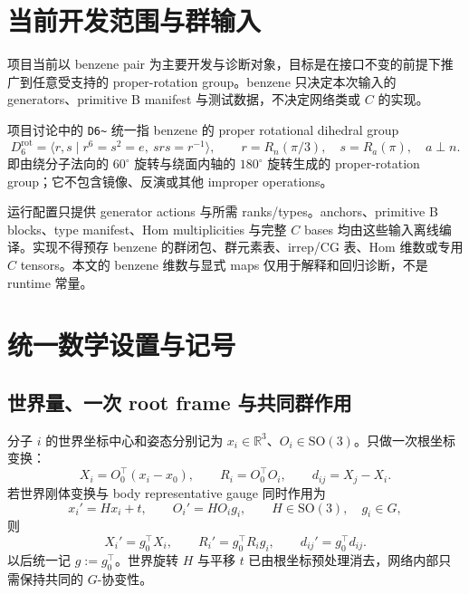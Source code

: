 \documentclass[11pt,a4paper,fontset=fandol]{ctexart}
\newcommand{\R}{\mathbb R}
\newcommand{\SO}{\mathrm{SO}}
\begin{document}
\section{当前开发范围与群输入}

项目当前以 benzene pair 为主要开发与诊断对象，目标是在接口不变的前提下推广到任意受支持的 proper-rotation group。benzene 只决定本次输入的 generators、primitive B manifest 与测试数据，不决定网络类或 $C$ 的实现。

项目讨论中的 \texttt{D6\textasciitilde} 统一指 benzene 的 proper rotational dihedral group
\begin{equation}
  D_6^{\mathrm{rot}}
  =\langle r,s\mid r^6=s^2=e,\ srs=r^{-1}\rangle,
  \qquad
  r=R_n(\pi/3),\quad s=R_a(\pi),\quad a\perp n.
\end{equation}
即由绕分子法向的 $60^\circ$ 旋转与绕面内轴的 $180^\circ$ 旋转生成的 proper-rotation group；它不包含镜像、反演或其他 improper operations。

运行配置只提供 generator actions 与所需 ranks/types。anchors、primitive B blocks、type manifest、Hom multiplicities 与完整 $C$ bases 均由这些输入离线编译。实现不得预存 benzene 的群闭包、群元素表、irrep/CG 表、Hom 维数或专用 $C$ tensors。本文的 benzene 维数与显式 maps 仅用于解释和回归诊断，不是 runtime 常量。

\section{统一数学设置与记号}

\subsection{世界量、一次 root frame 与共同群作用}

分子 $i$ 的世界坐标中心和姿态分别记为
$x_i\in\R^3$、$O_i\in\SO(3)$。只做一次根坐标变换：
\begin{equation}
  X_i=O_0^\top(x_i-x_0),
  \qquad
  R_i=O_0^\top O_i,
  \qquad
  d_{ij}=X_j-X_i.
  \label{eq:one-root}
\end{equation}
若世界刚体变换与 body representative gauge 同时作用为
\begin{equation}
  x_i' = Hx_i+t,
  \qquad
  O_i'=HO_i g_i,
  \qquad H\in\SO(3),\quad g_i\in G,
\end{equation}
则
\begin{equation}
  X_i'=g_0^\top X_i,
  \qquad
  R_i'=g_0^\top R_i g_i,
  \qquad
  d_{ij}'=g_0^\top d_{ij}.
  \label{eq:root-action}
\end{equation}
以后统一记 $g:=g_0^\top$。世界旋转 $H$ 与平移 $t$ 已由根坐标预处理消去，网络内部只需保持共同的 $G$-协变性。
\end{document}
